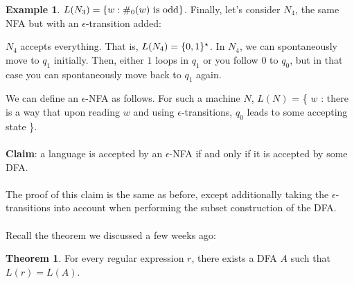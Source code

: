 \documentclass[]{article}
\DeclarePairedDelimiter{\set}{\lbrace}{\rbrace}
\theoremstyle{definition}
\newtheorem*{theorem}{Theorem}
\newtheorem{ex}{Example}[section]
\begin{document}
\begin{ex}
          $L(N_3) = \set{ w : \#_0(w) \text{ is odd}}$. Finally, let's consider $N_4$, the same NFA but with an $\epsilon$-transition added:
          \begin{center}
          \end{center}

          $N_4$ accepts everything. That is, $L(N_4) = \set{0, 1}^\star$. In $N_4$, we can spontaneously move to $q_1$ initially. Then, either $1$ loops in $q_1$ or you follow $0$ to $q_0$, but in that case you can spontaneously move back to $q_1$ again.
        \end{ex}

        We can define an $\epsilon$-NFA as follows. For such a machine $N$, $L(N)$ = \{ $w$ : there is a way that upon reading $w$ and using $\epsilon$-transitions, $q_0$ leads to some accepting state \}.
        \\ \\
        \textbf{Claim}: a language is accepted by an $\epsilon$-NFA if and only if it is accepted by some DFA.
        \\ \\
        The proof of this claim is the same as before, except additionally taking the $\epsilon$-transitions into account when performing the subset construction of the DFA.
        \\ \\
        Recall the theorem we discussed a few weeks ago:
        \begin{theorem}
          For every regular expression $r$, there exists a DFA $A$ such that $L(r) = L(A)$.
        \end{theorem}
\end{document}
